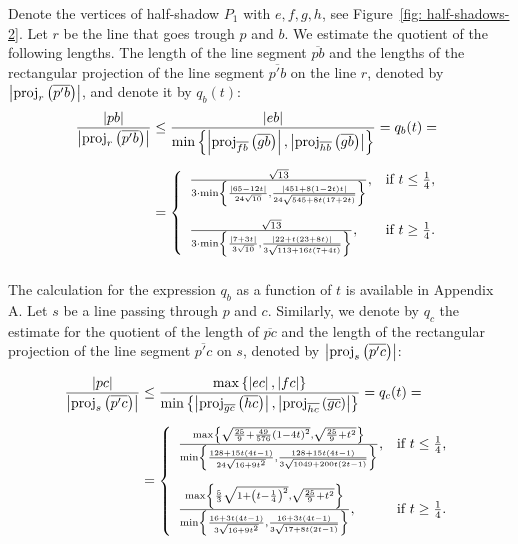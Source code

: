 Denote the vertices of half-shadow $P_{1}$ with $e,f,g,h$, see Figure~\ref{fig: half-shadows-2}. Let $r$ be the line that goes trough $p$ and $b$. We estimate the quotient of the following lengths. The length of the line segment $\overline{pb}$ and the lengths of the rectangular projection of the line segment $\overline{p'b}$ on the line $r$, denoted by $\left|\operatorname{proj}_{r} \left(\overline{p'b}\right) \right|$, and denote it by $q_{b}(t)$:
\begin{align*}
\frac{\left|pb\right|}{\left|\proj_{r} \left(\overline{p'b}\right)\right|} &\leq
\frac{\left|eb\right|}{\min
\left\{
\left|\proj_{\overline{fb}} \left(\overline{gb}\right)\right|,
\left|\proj_{\overline{hb}} \left(\overline{gb}\right)\right|
\right\}
} = q_{b}(t) = \\[6pt]%
&= \vertwopartdef
{ \frac{\sqrt{13}}{
3\cdot\min
\left\{ \frac{\left| 65 - 12 t \right|}{24 \sqrt{10}},
\frac{\left| 451 + 8 (1 - 2 t) t \right|}{24 \sqrt{545 + 8 t (17 + 2 t)}} \right\}
}, } {t \leq \frac{1}{4},}
{ \frac{\sqrt{13}}{
3\cdot\min
\left\{ \frac{\left| 7 + 3 t \right|}{3 \sqrt{10}},
\frac{\left| 22 + t (23 + 8 t) \right|}{3 \sqrt{113 + 16 t (7 + 4 t)}} \right\}
}, } {t \geq \frac{1}{4}.} \\[6pt]%
\end{align*}

The calculation for the expression $q_{b}$ as a function of $t$ is available in Appendix A. Let $s$ be a line passing through $p$ and $c$. Similarly, we denote by $q_{c}$ the estimate for the quotient of the length of $\overline{pc}$ and the length of the rectangular projection of the line segment $\overline{p'c}$ on $s$, denoted by $\left|\operatorname{proj}_{s} \left(\overline{p'c}\right) \right|$:

\begin{align*}
\frac{\left|pc\right|}{\left|\proj_{s} \left(\overline{p'c}\right)\right|} &\leq
\frac{\max\left\{ \left|ec\right|, \left|fc\right| \right\}}{\min
\left\{
\left|\proj_{\overline{gc}} \left(\overline{hc}\right)\right|,
\left|\proj_{\overline{hc}} \left(\overline{gc}\right)\right|
\right\}
} = q_{c}(t) = \\[6pt]%
&= \vertwopartdef
{
\frac{
\max
\left\{ \sqrt{\frac{25}{9} + \frac{49}{576}\left(1-4t\right)^{2}}, \sqrt{\frac{25}{9}+t^{2}} \right\}
}{
\min
\left\{ \frac{128 + 15t(4t-1)}{24 \sqrt{16+9t^{2}}},
\frac{128 + 15t(4t-1)}{3 \sqrt{1049+200t(2t-1)}} \right\}}, } {t \leq \frac{1}{4},}
{
\frac{
\max
\left\{ \frac{5}{3} \sqrt{1 + \left(t - \frac{1}{4}\right)^{2}}, \sqrt{\frac{25}{9}+t^{2}} \right\}
}{
\min
\left\{ \frac{16 + 3t(4t-1)}{3 \sqrt{16+9t^{2}}},
\frac{16 + 3t(4t-1)}{3 \sqrt{17 + 8t(2t-1)}} \right\}}, } {t \geq \frac{1}{4}.} \\[6pt]%
\end{align*}

